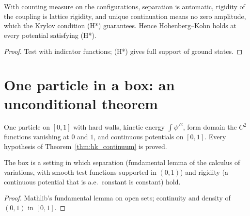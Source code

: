 \begin{theorem}
  \label{thm:hk_lattice_instance}
  \leanok
  With counting measure on the configurations, separation is automatic, rigidity of the coupling is lattice rigidity,
  and unique continuation means no zero amplitude, which the Krylov condition (H*) guarantees. Hence Hohenberg--Kohn
  holds at every potential satisfying (H*).
\end{theorem}
\begin{proof}
  \leanok
  Test with indicator functions; (H*) gives full support of ground states.
\end{proof}

\section{One particle in a box: an unconditional theorem}

One particle on $[0,1]$ with hard walls, kinetic energy $\int\psi'^2$, form domain the $C^2$ functions vanishing at
$0$ and $1$, and continuous potentials on $[0,1]$. Every hypothesis of Theorem~\ref{thm:hk_continuum} is proved.

\begin{lemma}
  \label{lem:box_setting}
  \leanok
  The box is a setting in which separation (fundamental lemma of the calculus of variations, with smooth test
  functions supported in $(0,1)$) and rigidity (a continuous potential that is a.e.\ constant is constant) hold.
\end{lemma}
\begin{proof}
  \leanok
  Mathlib's fundamental lemma on open sets; continuity and density of $(0,1)$ in $[0,1]$.
\end{proof}

